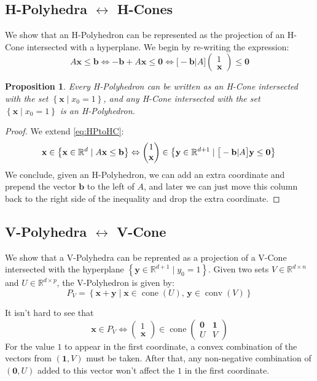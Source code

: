 \documentclass[fleqn]{article}
\renewcommand{\vec}[1]{\mathbf{#1}}
\newcommand{\set}[1]{\left\{#1\right\}}
\DeclareMathOperator{\cone}{cone}
\DeclareMathOperator{\conv}{conv}
\newcommand{\R}{\mathbb{R}}
\newcommand{\0}{\vec{0}}
\newcommand{\x}{\vec{x}}
\newcommand{\y}{\vec{y}}
\renewcommand{\b}{\vec{b}}
\newcommand{\st}{\;|\;}
\newcommand{\Udim}{p}
\newcommand{\Vdim}{n}
\newcommand{\yv}{\y \in \R^{d+1}}
\newcommand{\xv}{\x \in \R^d}
\newcommand{\mV}{V \in \R^{d\times \Vdim}}
\newcommand{\mU}{U \in \R^{d\times \Udim}}
\newcommand{\onex}{\begin{pmatrix*} 1\\ \x\end{pmatrix*}}
\newcommand{\lcone}{\begin{pmatrix*} \0 & \vec{1} \\ U & V \end{pmatrix*}}
\newtheorem{Prop}{Proposition}
\begin{document}
\subsection{H-Polyhedra $\leftrightarrow$ H-Cones}
We show that an H-Polyhedron can be represented as the projection of an H-Cone intersected with a hyperplane.  We begin by re-writing the expression:
\begin{equation}\label{eq:HPtoHC}
  A\x \leq \b \Leftrightarrow -\b + A\x \leq \0 \Leftrightarrow
     \big[-\b|A\big]\onex \leq \0 
\end{equation}

\begin{Prop}
  Every H-Polyhedron can be written as an H-Cone intersected with the set $\set{\x\st x_0 = 1}$, and any H-Cone intersected with the set $\set{\x\st x_0 = 1}$ is an H-Polyhedron.
\end{Prop}
\begin{proof}
We extend \eqref{eq:HPtoHC}:
\[ \x \in \set{\xv \st A\x \leq \b} \Leftrightarrow
   \onex \in \set{\yv \st \big[-\b|A\big]\y \leq \0}\\
\]
We conclude, given an H-Polyhedron, we can add an extra coordinate and prepend the vector $\b$ to the left of $A$, and later we can just move this column back to the right side of the inequality and drop the extra coordinate.
\end{proof}

\subsection{V-Polyhedra $\leftrightarrow$ V-Cone}

We show that a V-Polyhedra can be reprented as a projection of a V-Cone intersected with the hyperplane $\set{\yv \st y_0 = 1}$.  Given two sets $\mV$ and $\mU$, the V-Polyhedron is given by:
  \[ P_V = \set{\x + \y \st \x \in \cone(U),\, \y \in \conv(V)} \]

It isn't hard to see that
  \[ \x \in P_V \Leftrightarrow \onex \in \cone\lcone \]
For the value $1$ to appear in the first coordinate, a convex combination of the vectors from $(\vec{1}, V)$ must be taken.  After that, any non-negative combination of $(\0,U)$ added to this vector won't affect the $1$ in the first coordinate.
\end{document}
